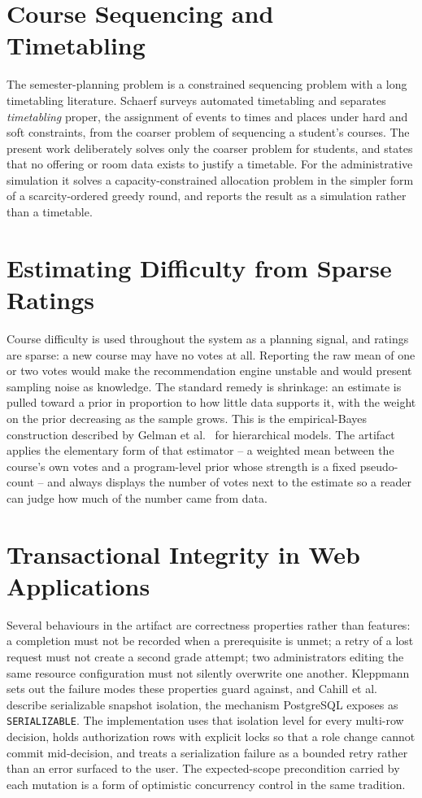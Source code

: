 \section{Course Sequencing and Timetabling}

The semester-planning problem is a constrained sequencing problem with a long timetabling
literature. Schaerf \cite{schaerf1999} surveys automated timetabling and separates
{\em timetabling} proper, the assignment of events to times and places under hard and soft
constraints, from the coarser problem of sequencing a student's courses. The present work deliberately solves
only the coarser problem for students, and states that no offering or room data exists to justify
a timetable. For the administrative simulation it solves a capacity-constrained allocation problem
in the simpler form of a scarcity-ordered greedy round, and reports the result as a simulation
rather than a timetable.

\section{Estimating Difficulty from Sparse Ratings}

Course difficulty is used throughout the system as a planning signal, and ratings are sparse: a
new course may have no votes at all. Reporting the raw mean of one or two votes would make the
recommendation engine unstable and would present sampling noise as knowledge. The standard remedy
is shrinkage: an estimate is pulled toward a prior in proportion to how little data supports it,
with the weight on the prior decreasing as the sample grows. This is the empirical-Bayes
construction described by Gelman et al.\ \cite{gelman2013} for hierarchical models. The artifact
applies the elementary form of that estimator -- a weighted mean between the course's own votes and
a program-level prior whose strength is a fixed pseudo-count -- and always displays the number of
votes next to the estimate so a reader can judge how much of the number came from data.

\section{Transactional Integrity in Web Applications}

Several behaviours in the artifact are correctness properties rather than features: a completion
must not be recorded when a prerequisite is unmet; a retry of a lost request must not create a
second grade attempt; two administrators editing the same resource configuration must not silently
overwrite one another. Kleppmann \cite{kleppmann2017} sets out the failure modes these properties
guard against, and Cahill et al.\ \cite{cahill2009} describe serializable snapshot isolation, the
mechanism PostgreSQL exposes as {\tt SERIALIZABLE}. The implementation uses that isolation level
for every multi-row decision, holds authorization rows with explicit locks so that a role change
cannot commit mid-decision, and treats a serialization failure as a bounded retry rather than an
error surfaced to the user. The expected-scope precondition carried by each mutation is a form of
optimistic concurrency control in the same tradition.


